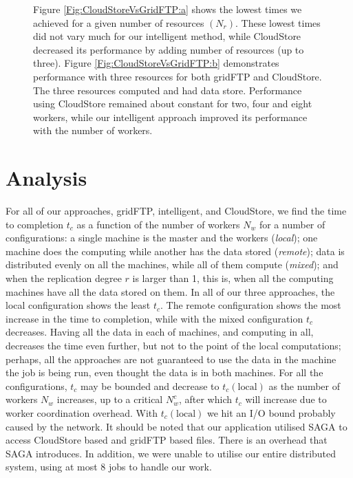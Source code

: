 \documentclass{rspublic}
\begin{document}
\begin{figure}
\begin{center}
{\label{Fig:CloudStoreVsGridFTP:b}
}
\caption{Figure \ref{Fig:CloudStoreVsGridFTP:a}
 shows the lowest times we achieved for a given number of resources
 $(N_{r})$. These lowest times did not vary much for our intelligent
 method, while CloudStore decreased its performance by adding number of
 resources (up to three). Figure \ref{Fig:CloudStoreVsGridFTP:b}
 demonstrates performance with three resources for both gridFTP and
 CloudStore. The three resources computed and had data store.
 Performance using CloudStore remained about constant for two, four and
 eight workers, while our intelligent approach improved its performance
 with the number of workers.}
\label{Fig:CloudStoreVsGridFTP}
\end{center}
\end{figure}

%

\section{Analysis}

For all of our approaches, gridFTP, intelligent, and CloudStore, we find
the time to completion $t_c$ as a function of the number of workers $N_w$ for a number of configurations: a single machine is the master and the workers (\textit{local}); one machine does the computing while another has the data stored (\textit{remote}); data is distributed evenly on all the machines, while all of them compute (\textit{mixed}); and when the replication degree $r$ is larger than 1, this is, when all the computing machines have all the data stored on them. In all of our three approaches, the local configuration shows the least $t_c$. The remote configuration shows the most increase in the time to completion, while with the mixed configuration $t_c$ decreases. Having all
the data in each of machines, and computing in all, decreases the
time even further, but not to the point of the local computations;
perhaps, all the approaches are not guaranteed to use the data in the
machine the job is being run, even thought the data is in both machines. For all the configurations, $t_c$ may be bounded and decrease to $t_c(\mbox{local})$ as the number of workers $N_w$ increases, up to a critical
$N^c_w$, after which $t_c$ will increase due to worker coordination
overhead. With $t_c(\mbox{local})$ we hit an I/O bound probably caused by the network.
It should be noted that 
our application utilised SAGA to access CloudStore based and gridFTP based
files. There is an overhead that SAGA introduces. In addition, we were
unable to utilise our entire distributed system, using at most 8 jobs to
handle our work.
\end{document}
